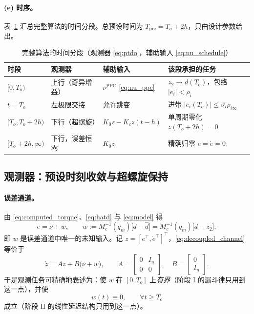 \paragraph{(e) 时序。}
表~\ref{tab:schedule} 汇总完整算法的时间分段。总预设时间为 \(T_{\mathrm{pre}}=T_o+2h\)，只由设计参数给出。

\begin{table}[H]
\centering
\caption{完整算法的时间分段（观测器 \eqref{eq:ptdo}，辅助输入 \eqref{eq:nu_schedule}）}
\label{tab:schedule}
\small\begin{tabular}{llll}
\toprule
时段 & 观测器 & 辅助输入 & 该段承担的任务 \\
\midrule
\([0,T_o)\) & 上行（奇异增益） & \(\nu^{\mathrm{PPC}}\) \eqref{eq:nu_ppc} & \(z_2\to d(T_o)\)，包络 \(\lvert e_i\rvert<\rho_i\) \\
\(t=T_o\) & 左极限交接 & 允许跳变 & 进带 \(\lvert e_i(T_o)\rvert\le\vartheta_i\rho_{i\infty}\) \\
\([T_o,T_o+2h)\) & 下行（超螺旋） & \(K_0z-K_cz(t-h)\) & 单周期零化 \(z(T_o+2h)=0\) \\
\([T_o+2h,\infty)\) & 下行，误差恒零 & \(K_0z\) & 精确归零 \(e=\dot e=0\) \\
\bottomrule
\end{tabular}
\end{table}

\subsection{观测器：预设时刻收敛与超螺旋保持}
\label{sec:ptdo}

\paragraph{误差通道。}
由 \eqref{eq:computed_torque}、\eqref{eq:hatd} 与 \eqref{eq:model} 得
\begin{equation}
\ddot e=\nu+w,\qquad
w:=M_e^{-1}(q_m)\bigl[d-\hat d\bigr]=M_e^{-1}(q_m)\bigl[d-z_2\bigr],
\label{eq:decoupled_channel}
\end{equation}
即 \(w\) 是误差通道中唯一的未知输入。记 \(z=[e^{\top},\dot e^{\top}]^{\top}\)，\eqref{eq:decoupled_channel} 等价于
\begin{equation}
\dot z=Az+B\bigl(\nu+w\bigr),\qquad
A=\begin{bmatrix}0&I_n\\0&0\end{bmatrix},\quad B=\begin{bmatrix}0\\I_n\end{bmatrix}.
\label{eq:linear_error}
\end{equation}
于是观测任务可精确地表述为：使 \(w\) 在 \([0,T_o]\) 上\emph{有界}（阶段 I 的漏斗律只用到这一点），并使
\begin{equation}
w(t)\equiv0,\qquad \forall t\ge T_o
\label{eq:w_zero}
\end{equation}
成立（阶段 II 的线性延迟结构只用到这一点）。

